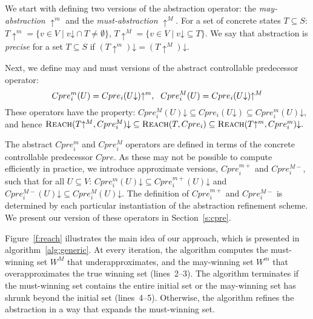 \documentclass{article}
\newcommand{\reach}[0]{\textsc{Reach}}
\newcommand{\concrete}[1]{#1\mathord{\downarrow}}
\newcommand{\abstractm}[1]{#1\mathord{\uparrow^m}}
\newcommand{\abstractM}[1]{#1\mathord{\uparrow^M}}
\begin{document}
We start with defining two versions of the abstraction operator: 
the \emph{may-abstraction} $\abstractm{}$ and the 
\emph{must-abstraction} $\abstractM{}$. For a set of concrete 
states $T \subseteq S$:
$\abstractm{T} = \{v\in V\mid \concrete{v} \cap T \neq 
\emptyset\}$, $\abstractM{T} = \{v\in V\mid \concrete{v} \subseteq 
T \}$.
We say that abstraction is \emph{precise} for a set $T\subseteq S$ 
if $\concrete{(\abstractm{T})} = \concrete{(\abstractM{T})}$.

Next, we define may and must versions of the abstract controllable 
predecessor operator:
\begin{equation}
    \small
    Cpre_i^m(U) = \abstractm{Cpre_i(\concrete{U})},~~
    Cpre_i^M(U) = \abstractM{Cpre_i(\concrete{U})}
\label{e:cpremM}
\end{equation}
These operators have the property:
$\concrete{Cpre_i^M(U)} \subseteq Cpre_i(\concrete{U}) \subseteq \concrete{Cpre_i^m(U)},$ and hence
$\concrete{\reach(\abstractM{T}, Cpre_i^M)} \subseteq \reach(T, Cpre_i) \subseteq \concrete{\reach(\abstractm{T}, Cpre_i^m)}.$

The abstract $Cpre_i^m$ and $Cpre_i^M$ operators are defined in 
terms of the concrete controllable predecessor $Cpre$. As these 
may not be possible to compute efficiently in practice, we 
introduce approximate versions, $Cpre_i^{m+}$ and $Cpre_i^{M-}$, 
such that for all $U\subseteq V$: $\concrete{Cpre_i^m(U)} 
\subseteq \concrete{Cpre_i^{m+}(U)}$ and 
$\concrete{Cpre_i^{M-}(U)}
\subseteq \concrete{Cpre_i^M(U)}.$  The definition of 
$Cpre_i^{m+}$ and $Cpre_i^{M-}$ is determined by each particular 
instantiation of the abstraction refinement scheme.  We present 
our version of these operators in Section~\ref{s:cpre}.  

Figure~\ref{f:reach} illustrates the main idea of our approach, 
which is presented in algorithm~\ref{alg:generic}.  At every 
iteration, the algorithm computes the must-winning set $W^M$ that 
underapproximates, and the may-winning set $W^m$ that 
overapproximates the true winning set (lines~2--3).  The algorithm 
terminates if the must-winning set contains the entire initial set 
or the may-winning set has shrunk beyond the initial set 
(lines~4--5).  Otherwise, the algorithm refines the abstraction in 
a way that expands the must-winning set.
\end{document}
